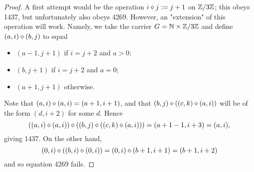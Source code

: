 \begin{proof} A first attempt would be the operation $i \diamond j := j+1$ on $\mathbb{Z}/3\mathbb{Z}$; this obeys 1437, but unfortunately also obeys 4269.  However, an "extension" of this operation will work. Namely, we take the carrier $G = \mathbb{N} \times \mathbb{Z}/3\mathbb{Z}$ and define $(a,i) \diamond (b,j)$ to equal
  \begin{itemize}
    \item $(a-1,j+1)$ if $i=j+2$ and $a>0$;
    \item $(b,j+1)$ if $i=j+2$ and $a=0$;
    \item $(a+1,j+1)$ otherwise.
  \end{itemize}
Note that $(a,i) \diamond (a,i) = (a+1,i+1)$, and that $(b,j) \diamond ((c,k) \diamond (a,i))$ will be of the form $(d,i+2)$ for some $d$.  Hence
$$ ((a,i) \diamond (a,i)) \diamond ((b,j) \diamond ((c,k) \diamond (a,i))) = (a+1-1, i+3) = (a,i),$$
giving 1437.  On the other hand,
$$ (0,i) \diamond ((b,i) \diamond (0,i)) = (0,i) \diamond (b+1,i+1) = (b+1,i+2)$$
and so equation 4269 fails.
\end{proof}
